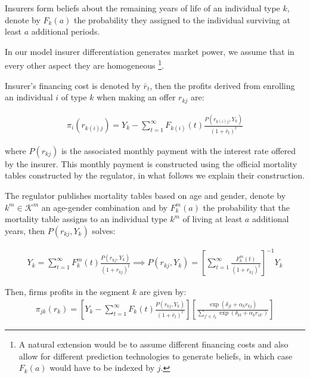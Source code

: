 \documentclass[12pt]{article}
\theoremstyle{plain}
\theoremstyle{plain}
\begin{document}
Insurers form beliefs about the remaining years of life of an individual type $k$, denote by $F_k(a)$ the probability they assigned to the individual surviving at least $a$ additional periods. 

In our model insurer differentiation generates market power, we assume that in every other aspect they are homogeneous \footnote{A natural extension would be to assume different financing costs and also allow for different prediction technologies to generate beliefs, in which case $F_k(a)$ would have to be indexed by $j$. }.

Insurer's financing cost is denoted by $\bar{r}_t$, then the profits derived from enrolling an individual $i$ of type $k$ when making an offer $r_{kj}$ are: 

\begin{align}\label{eq:individual_profits}
    \pi_{i}(r_{k(i)j}) =
    Y_k -   \sum_{t=1}^{\infty} F_{k(i)}(t) \frac{P(r_{k(i)j},Y_k)}{(1+\bar{r}_t)^t} 
\end{align}

where $P(r_{kj})$ is the associated monthly payment with the interest rate offered by the insurer. This monthly payment is constructed using the official mortality tables constructed by the regulator, in what follows we explain their construction. 

The regulator publishes mortality tables based on age and gender, denote by $k^m \in \mathcal{K}^m$ an age-gender combination and by $F_k^m(a)$ the probability that the mortality table assigns to an individual type $k^m$ of living at least $a$ additional years, then $P(r_{kj},Y_k)$ solves:

\begin{align}
    Y_k = \sum_{t=1}^{\infty} F_k^m(t) \frac{P(r_{kj},Y_k)}{(1+r_{kj})^t} \implies  P(r_{kj},Y_k) = \left[\sum_{t=1}^{\infty}  \frac{F_k^m(t)}{(1+r_{kj})^t} \right]^{-1} Y_k
\end{align}





Then, firms profits in the segment $k$ are given by: 
\begin{align}
    \pi_{jk}( r_k) = \left[Y_k -   \sum_{t=1}^{\infty} F_k(t) \frac{P(r_{kj},Y_k)}{(1+\bar{r}_t)^t} \right] \left[\frac{\exp(\delta_{jt} + \alpha_{k}r_{kj})}{\sum_{j'\in J_k}\exp(\delta_{kt} + \alpha_kr_{ik'})}\right]
\end{align}
\end{document}
